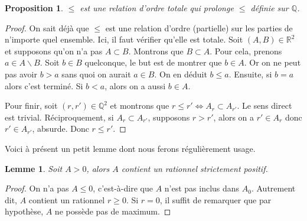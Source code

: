 \documentclass[french]{book}
\theoremstyle{plain}
\newtheorem{lem}{Lemme}[chapter]
\newtheorem{prop}{Proposition}[chapter]
\theoremstyle{definition}
\theoremstyle{remark}
\begin{document}
\begin{prop}
	$\leqslant$ est une relation d'ordre totale qui prolonge $\leqslant$ définie sur $\mathbb{Q}$.
\end{prop}
\begin{proof}
	On sait déjà que $\leqslant$ est une relation d'ordre (partielle) sur les parties de n'importe quel ensemble. Ici, il faut vérifier qu'elle est totale. Soit $(A,B) \in \mathbb{R}^2$ et supposons qu'on n'a pas $A \subset B$. Montrons que $B \subset A$. Pour cela, prenons $a \in A \backslash B$. Soit $b \in B$ quelconque, le but est de montrer que $b \in A$. Or on ne peut pas avoir $b > a$ sans quoi on aurait $a \in B$. On en déduit $b \leqslant a$. Ensuite, si $b = a$ alors c'est terminé. Si $b < a$, alors on a aussi $b \in A$. \par
	Pour finir, soit $(r,r') \in \mathbb{Q}^2$ et montrons que $r \leqslant r' \Leftrightarrow A_r \subset A_{r'}$. Le sens direct est trivial. Réciproquement, si $A_r \subset A_{r'}$, supposons $r > r'$, alors on a $r' \in A_r$ donc $r' \in A_{r'}$, absurde. Donc $r \leqslant r'$.
\end{proof}
Voici à présent un petit lemme dont nous ferons régulièrement usage.
\begin{lem}
	Soit $A > 0$, alors $A$ contient un rationnel strictement positif.
\end{lem}
\begin{proof}
	On n'a pas $A \leqslant 0$, c'est-à-dire que $A$ n'est pas inclus dans $A_0$. Autrement dit, $A$ contient un rationnel $r \geqslant 0$. Si $r = 0$, il suffit de remarquer que par hypothèse, $A$ ne possède pas de maximum.
\end{proof}
\end{document}
